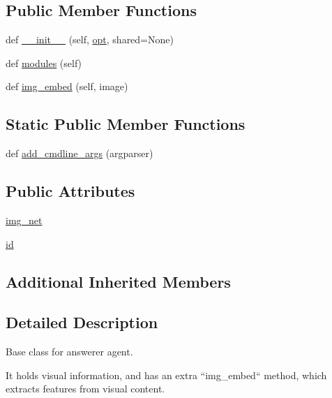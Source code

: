 \subsection*{Public Member Functions}
\begin{DoxyCompactItemize}
\item 
def \hyperlink{classprojects_1_1taskntalk_1_1coopgame__agent_1_1AnswererAgent_a7781c189ee128bbbf7c59536411a5cd8}{\+\_\+\+\_\+init\+\_\+\+\_\+} (self, \hyperlink{classparlai_1_1core_1_1agents_1_1Agent_ab3b45d2754244608c75d4068b90cd051}{opt}, shared=None)
\item 
def \hyperlink{classprojects_1_1taskntalk_1_1coopgame__agent_1_1AnswererAgent_ae75c09cc8f494a77e625a577fea676ec}{modules} (self)
\item 
def \hyperlink{classprojects_1_1taskntalk_1_1coopgame__agent_1_1AnswererAgent_a866af3a411fe6c7d10e34306ea0d681b}{img\+\_\+embed} (self, image)
\end{DoxyCompactItemize}
\subsection*{Static Public Member Functions}
\begin{DoxyCompactItemize}
\item 
def \hyperlink{classprojects_1_1taskntalk_1_1coopgame__agent_1_1AnswererAgent_a41be165d9cb3245e1f41be573020308e}{add\+\_\+cmdline\+\_\+args} (argparser)
\end{DoxyCompactItemize}
\subsection*{Public Attributes}
\begin{DoxyCompactItemize}
\item 
\hyperlink{classprojects_1_1taskntalk_1_1coopgame__agent_1_1AnswererAgent_aaacafcdb5120fcb653f10312fb27177c}{img\+\_\+net}
\item 
\hyperlink{classprojects_1_1taskntalk_1_1coopgame__agent_1_1AnswererAgent_aed3237a6db100286caf99f18f2596def}{id}
\end{DoxyCompactItemize}
\subsection*{Additional Inherited Members}


\subsection{Detailed Description}
\begin{DoxyVerb}Base class for answerer agent.

It holds visual information, and has an extra  ``img_embed`` method, which extracts
features from visual content.
\end{DoxyVerb}
 


